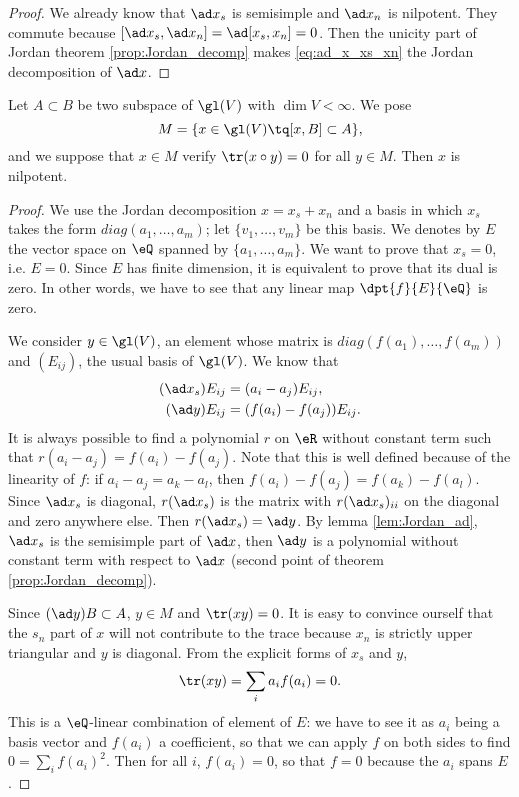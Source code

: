 \begin{proof}
We already know that $\ad x_s$ is semisimple and $\ad x_n$ is nilpotent. They commute because $[\ad x_s,\ad x_n]=\ad[x_s,x_n]=0$. Then the unicity part of Jordan theorem \ref{prop:Jordan_decomp} makes \eqref{eq:ad_x_xs_xn} the Jordan decomposition of $\ad x$.
\end{proof}

\begin{lemma}\label{lem:M_nil}
Let $A\subset B$ be two subspace of $\gl(V)$ with $\dim V<\infty$. We pose 
\[
   M=\{x\in\gl(V)\tq [x,B]\subset A\},
\]
and we suppose that $x\in M$ verify $\tr(x\circ y)=0$ for all $y\in M$. Then $x$ is nilpotent.
\end{lemma}

\begin{proof}
We use the Jordan decomposition $x=x_s+x_n$ and a basis in which $x_s$ takes the form $diag(a_1,\ldots,a_m)$; let $\{v_1,\ldots,v_m\}$ be this basis. We denotes by $E$ the vector space on $\eQ$ spanned by $\{a_1,\ldots,a_m\}$. We want to prove that $x_s=0$, i.e. $E=0$. Since $E$ has finite dimension, it is equivalent to prove that its dual is zero. In other words, we have to see that any linear map $\dpt{f}{E}{\eQ}$ is zero.

We consider $y\in\gl(V)$, an element whose matrix is $diag(f(a_1),\ldots,f(a_m))$ and $(E_{ij})$, the usual basis of $\gl(V)$. We know that 
\begin{subequations}
\begin{align}
  (\ad x_s)E_{ij}&=(a_i-a_j)E_{ij},\\
  (\ad y)E_{ij}&=(f(a_i)-f(a_j))E_{ij}.
\end{align}
\end{subequations}
It is always possible to find a polynomial $r$ on $\eR$ without constant term such that $r(a_i-a_j)=f(a_i)-f(a_j)$. Note that this is well defined because of the linearity of $f$: if $a_i-a_j=a_k-a_l$, then $f(a_i)-f(a_j)=f(a_k)-f(a_l)$. Since $\ad x_s$ is diagonal, $r(\ad x_s)$ is the matrix with $r(\ad x_s)_{ii}$ on the diagonal and zero anywhere else. Then $r(\ad x_s)=\ad y$. By lemma \ref{lem:Jordan_ad}, $\ad x_s$ is the semisimple part of $\ad x$, then $\ad y$ is  a polynomial without constant term with respect to $\ad x$ (second point of theorem \ref{prop:Jordan_decomp}).

Since $(\ad y)B\subset A$, $y\in M$ and $\tr(xy)=0$. It is easy to convince ourself that the $s_n$ part of $x$ will not contribute to the trace because $x_n$ is strictly upper triangular and $y$ is diagonal. From the explicit forms of $x_s$ and $y$,
\[
  \tr(xy)=\sum_ia_if(a_i)=0.
\]
This is a $\eQ$-linear combination of element of $E$: we have to see it as $a_i$ being a basis vector and $f(a_i)$ a coefficient, so that we can apply $f$ on both sides to find $0=\sum_if(a_i)^2$. Then for all $i$, $f(a_i)=0$, so that $f=0$ because  the $a_i$ spans $E$.
\end{proof}

